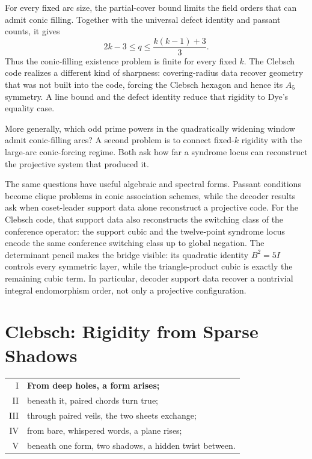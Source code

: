 \documentclass[11pt]{article}
\theoremstyle{definition}
\theoremstyle{remark}
\begin{document}
For every fixed arc size, the partial-cover bound limits the field orders
that can admit conic filling.  Together with the universal defect identity
and passant counts, it gives
\[
 2k-3\le q\le\frac{k(k-1)+3}{3}.
\]
Thus the conic-filling existence problem is finite for every fixed \(k\).
The Clebsch code realizes a different kind of sharpness: covering-radius
data recover geometry that was not built into the code, forcing the
Clebsch hexagon and hence its $A_5$ symmetry. A line bound and the defect
identity reduce that rigidity to Dye's equality case.

More generally, which odd prime powers in the
quadratically widening window admit conic-filling arcs? A second problem is
to connect fixed-$k$ rigidity with the large-arc conic-forcing regime. Both
ask how far a syndrome locus can reconstruct the projective system that
produced it.

The same questions have useful algebraic and spectral forms.  Passant
conditions become clique problems in conic association schemes, while the
decoder results ask when coset-leader support data alone reconstruct a
projective code.  For the Clebsch code, that support data also reconstructs
the switching class of the conference operator: the support cubic
and the twelve-point syndrome locus encode the same conference switching
class up to global negation.
The determinant pencil makes the bridge visible: its quadratic identity
$B^2=5I$ controls every symmetric layer, while the triangle-product cubic is exactly
the remaining cubic term.  In particular, decoder support data recover a
nontrivial integral endomorphism order, not only a projective configuration.

\clearpage
\section*{Clebsch: Rigidity from Sparse Shadows}

\begin{center}
\begin{tabular}{@{}r@{\hskip 1.4em}l@{}}
{\scriptsize I}   & \textbf{From deep holes, a form arises;}\\
{\scriptsize II}  & beneath it, paired chords turn true;\\
{\scriptsize III} & through paired veils, the two sheets exchange;\\
{\scriptsize IV}  & from bare, whispered words, a plane rises;\\
{\scriptsize V}   & beneath one form, two shadows, a hidden twist between.
\end{tabular}
\end{center}
\end{document}
